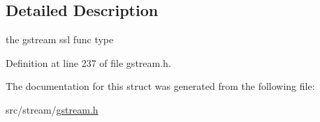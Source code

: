 \subsection{Detailed Description}
the gstream ssl func type 

Definition at line 237 of file gstream.\-h.



The documentation for this struct was generated from the following file\-:\begin{DoxyCompactItemize}
\item 
src/stream/\hyperlink{gstream_8h}{gstream.\-h}\end{DoxyCompactItemize}
